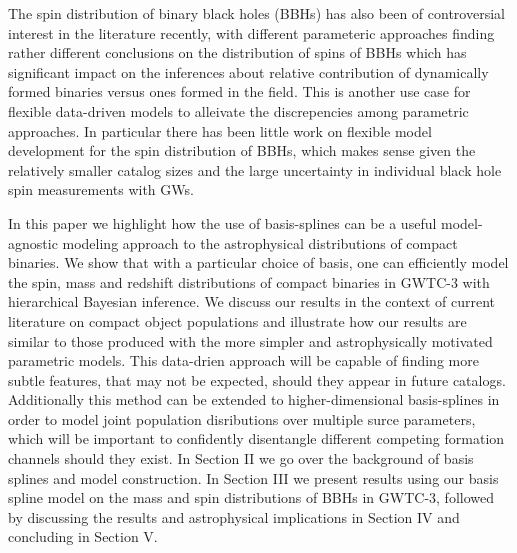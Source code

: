 The spin distribution of binary black holes (BBHs) has also been of controversial interest in the literature recently, with different parameteric approaches finding 
rather different conclusions on the distribution of spins of BBHs which has significant impact on the inferences about relative contribution of dynamically formed
binaries versus ones formed in the field. This is another use case for flexible data-driven models to alleivate the discrepencies among parametric approaches. 
In particular there has been little work on flexible model development for the spin distribution of BBHs, which makes sense given the relatively smaller catalog 
sizes and the large uncertainty in individual black hole spin measurements with GWs.

In this paper we highlight how the use of basis-splines can be a useful model-agnostic modeling approach to the astrophysical distributions of compact 
binaries. We show that with a particular choice of basis, one can efficiently model the spin, mass and redshift distributions of compact binaries in GWTC-3 with
hierarchical Bayesian inference. We discuss our results in the context of current literature on compact object populations and illustrate how our results are similar
to those produced with the more simpler and astrophysically motivated parametric models. This data-drien approach will be capable of finding more subtle features, that 
may not be expected, should they appear in future catalogs. Additionally this method can be extended to higher-dimensional basis-splines in order to model 
joint population disributions over multiple surce parameters, which will be important to confidently disentangle different competing formation channels 
should they exist. In Section II we go over the background of basis splines and model construction. In Section III we present results using our basis spline model 
on the mass and spin distributions of BBHs in GWTC-3, followed by discussing the results and astrophysical implications in Section IV and concluding in Section V.
